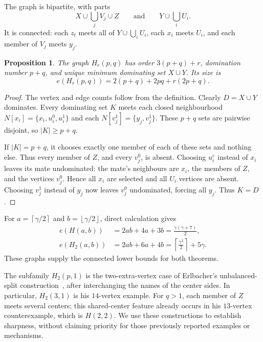 \documentclass[11pt]{article}
\newtheorem{proposition}[theorem]{Proposition}
\theoremstyle{definition}
\theoremstyle{remark}
\newcommand{\e}{e}
\newcommand{\ceil}[1]{\left\lceil#1\right\rceil}
\newcommand{\floor}[1]{\left\lfloor#1\right\rfloor}
\begin{document}
The graph is bipartite, with parts
\begin{equation}\label{eq:parts}
 X\cup\bigcup_jV_j\cup Z
 \qquad\text{and}\qquad
 Y\cup\bigcup_iU_i.
\end{equation}
It is connected: each $z_t$ meets all of $Y\cup\bigcup_iU_i$, each $x_i$
meets $U_i$, and each member of $V_j$ meets $y_j$.

\begin{proposition}\label{prop:H}
The graph $H_r(p,q)$ has order $3(p+q)+r$, domination number $p+q$, and
unique minimum dominating set $X\cup Y$. Its size is
\begin{equation}\label{eq:Hcount}
 \e(H_r(p,q))=2(p+q)+2pq+r(2p+q).
\end{equation}
\end{proposition}

\begin{proof}
The vertex and edge counts follow from the definition. Clearly
$D=X\cup Y$ dominates. Every dominating set $K$ meets each closed
neighbourhood $N[x_i]=\{x_i,u_i^0,u_i^1\}$ and each
$N[v_j^1]=\{y_j,v_j^1\}$. These $p+q$ sets are pairwise disjoint, so
$|K|\ge p+q$.

If $|K|=p+q$, it chooses exactly one member of each of these sets and
nothing else. Thus every member of $Z$, and every $v_j^0$, is absent.
Choosing $u_i^\varepsilon$ instead of $x_i$ leaves its mate undominated:
the mate's neighbours are $x_i$, the members of $Z$, and the vertices
$v_j^0$. Hence all $x_i$ are selected and all $U_i$ vertices are absent.
Choosing $v_j^1$ instead of $y_j$ now leaves $v_j^0$ undominated, forcing
all $y_j$. Thus $K=D$.
\end{proof}

For $a=\ceil{\gamma/2}$ and $b=\floor{\gamma/2}$, direct calculation gives
\begin{align}
 \e(H(a,b))&=2ab+4a+3b=\frac{\gamma(\gamma+7)}2,\label{eq:attain}\\
 \e(H_2(a,b))&=2ab+6a+4b
     =\ceil{\frac{\gamma^2}{2}}+5\gamma.\label{eq:attain2}
\end{align}
These graphs supply the connected lower bounds for both theorems.

The subfamily $H_2(p,1)$ is the two-extra-vertex case of Erlbacher's
unbalanced-split construction~\cite{E}, after interchanging the names of
the center sides. In particular, $H_2(3,1)$ is his $14$-vertex example.
For $q>1$, each member of $Z$ meets several centers; this shared-center
feature already occurs in his $13$-vertex counterexample, which is $H(2,2)$.
We use these constructions to establish sharpness, without claiming
priority for those previously reported examples or mechanisms.
\end{document}
